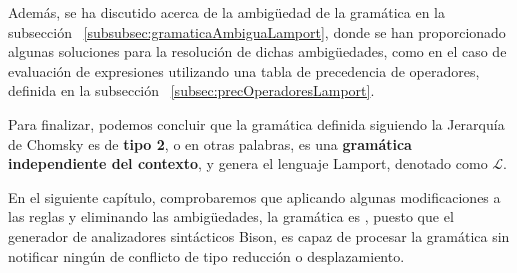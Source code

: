 Además, se ha discutido acerca de la ambigüedad de la gramática en la subsección ~\ref{subsubsec:gramaticaAmbiguaLamport}, donde se han proporcionado algunas soluciones para la resolución de dichas ambigüedades, como en el caso de evaluación de expresiones utilizando una tabla de precedencia de operadores, definida en la subsección ~\ref{subsec:precOperadoresLamport}.

\vspace{0.5cm}

Para finalizar, podemos concluir que la gramática definida siguiendo la Jerarquía de Chomsky es de \textbf{tipo 2}, o en otras palabras, es una \textbf{gramática independiente del contexto}, y genera el lenguaje Lamport, denotado como $\mathscr{L}$.

\vspace{0.5cm}

En el siguiente capítulo, comprobaremos que aplicando algunas modificaciones a las reglas y eliminando las ambigüedades, la gramática es , puesto que el generador de analizadores sintácticos Bison, es capaz de procesar la gramática sin notificar ningún de conflicto de tipo reducción o desplazamiento.